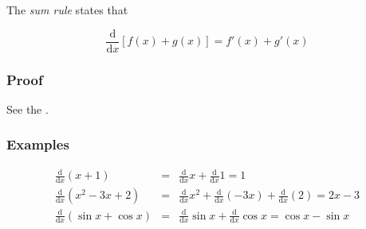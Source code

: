 \documentclass[12pt]{article}
\newcommand{\D}[1]{\ensuremath{\mathrm{d}#1}}
\newcommand{\DDX}{\ensuremath{\frac{\D{}}{\D{x}}}}
\begin{document}

The \emph{sum rule} states that

\begin{equation*}
\DDX\left[f(x)+g(x)\right] = f'(x) + g'(x)
\end{equation*}

\subsubsection*{Proof}

See the .

\subsubsection*{Examples}

\begin{eqnarray*}
\DDX(x + 1) & = & \DDX x + \DDX 1 = 1 \\
\DDX(x^2 - 3x + 2) & = & \DDX x^2 + \DDX(-3x) + \DDX(2) = 2x-3 \\
\DDX(\sin x + \cos x) & = & \DDX\sin x + \DDX\cos x = \cos x - \sin x
\end{eqnarray*}
\end{document}

